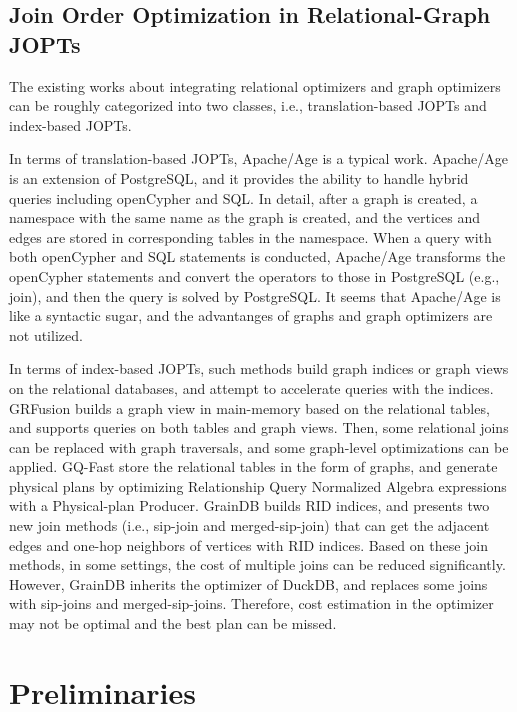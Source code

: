 \documentclass[sigconf, nonacm]{acmart}
\begin{document}
\subsection{Join Order Optimization in Relational-Graph JOPTs}
\label{sec:related-work:ropt-gopt}
The existing works about integrating relational optimizers and graph optimizers can be roughly categorized into two classes, i.e., translation-based JOPTs and index-based JOPTs.

In terms of translation-based JOPTs, Apache/Age \cite{apache-age} is a typical work.
Apache/Age is an extension of PostgreSQL, and it provides the ability to handle hybrid queries including openCypher and SQL.
In detail, after a graph is created, a namespace with the same name as the graph is created, and the vertices and edges are stored in corresponding tables in the namespace.
When a query with both openCypher and SQL statements is conducted, Apache/Age transforms the openCypher statements and convert the operators to those in PostgreSQL (e.g., join), and then the query is solved by PostgreSQL.
It seems that Apache/Age is like a syntactic sugar, and the advantanges of graphs and graph optimizers are not utilized.

In terms of index-based JOPTs, such methods build graph indices or graph views on the relational databases, and attempt to accelerate queries with the indices.
GRFusion \cite{GRFusion} builds a graph view in main-memory based on the relational tables, and supports queries on both tables and graph views.
Then, some relational joins can be replaced with graph traversals, and some graph-level optimizations can be applied.
GQ-Fast \cite{gqfast} store the relational tables in the form of graphs, and generate physical plans by optimizing Relationship Query Normalized Algebra expressions with a Physical-plan Producer.
GrainDB \cite{graindb} builds RID indices, and presents two new join methods (i.e., sip-join and merged-sip-join) that can get the adjacent edges and one-hop neighbors of vertices with RID indices.
Based on these join methods, in some settings, the cost of multiple joins can be reduced significantly.
However, GrainDB inherits the optimizer of DuckDB, and replaces some joins with sip-joins and merged-sip-joins.
Therefore, cost estimation in the optimizer may not be optimal and the best plan can be missed.


\section{Preliminaries}
\label{sec:preliminaries}
\end{document}
